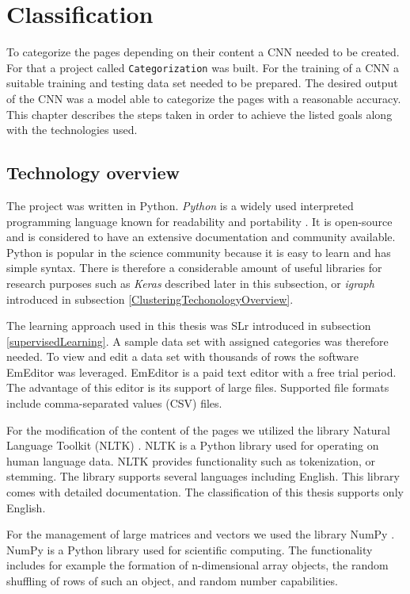 \section{Classification} \label{ClassificationDevelopment}
To categorize the pages depending on their content a CNN needed to be created. For that a project called \texttt{Categorization} was built. For the training of a CNN a suitable training and testing data set needed to be prepared. The desired output of the CNN was a model able to categorize the pages with a reasonable accuracy. This chapter describes the steps taken in order to achieve the listed goals along with the technologies used.

\subsection{Technology overview} \label{ClassificationTechonologyOverview}
The project was written in Python. \textit{Python} is a widely used interpreted programming language known for readability and portability \cite{aboutPython}. It is open-source and is considered to have an extensive documentation and community available. Python is popular in the science community because it is easy to learn and has simple syntax. There is therefore a considerable amount of useful libraries for research purposes such as \textit{Keras} described later in this subsection, or \textit{igraph} introduced in subsection \ref{ClusteringTechonologyOverview}.  

The learning approach used in this thesis was SLr introduced in subsection \ref{supervisedLearning}. A sample data set with assigned categories was therefore needed. To view and edit a data set with thousands of rows the software EmEditor \cite{emeditor} was leveraged. EmEditor is a paid text editor with a free trial period. The advantage of this editor is its support of large files. Supported file formats include comma-separated values (CSV) files. 

For the modification of the content of the pages we utilized the library Natural Language Toolkit (NLTK) \cite{nltk}. NLTK is a Python library used for operating on human language data. NLTK provides functionality such as tokenization, or stemming. The library supports several languages including English. This library comes with detailed documentation. The classification of this thesis supports only English.

For the management of large matrices and vectors we used the library NumPy \cite{numpy}. NumPy is a Python library used for scientific computing. The functionality includes for example the formation of n-dimensional array objects, the random shuffling of rows of such an object, and random number capabilities. 

